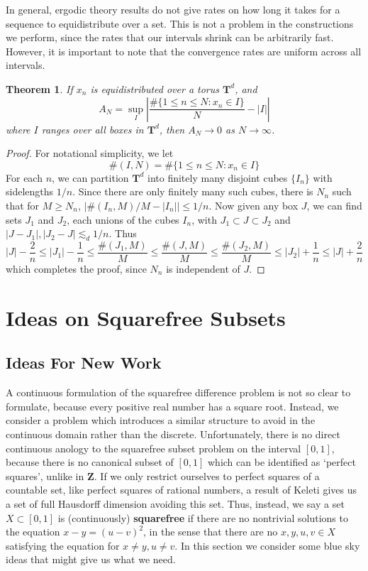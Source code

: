 \documentclass{report}
\theoremstyle{plain}
\theoremstyle{plain}
\newtheorem{theorem}{Theorem}
\begin{document}
In general, ergodic theory results do not give rates on how long it takes for a sequence to equidistribute over a set. This is not a problem in the constructions we perform, since the rates that our intervals shrink can be arbitrarily fast. However, it is important to note that the convergence rates are uniform across all intervals.

\begin{theorem}
    If $x_n$ is equidistributed over a torus $\mathbf{T}^d$, and
    \[ A_N = \sup_I \left| \frac{\# \{ 1 \leq n \leq N : x_n \in I \}}{N} - |I| \right| \]
    where $I$ ranges over all boxes in $\mathbf{T}^d$, then $A_N \to 0$ as $N \to \infty$.
\end{theorem}
\begin{proof}
    For notational simplicity, we let
    \[ \# (I,N) = \# \{ 1 \leq n \leq N: x_n \in I \} \]
    For each $n$, we can partition $\mathbf{T}^d$ into finitely many disjoint cubes $\{ I_n \}$ with sidelengths $1/n$. Since there are only finitely many such cubes, there is $N_n$ such that for $M \geq N_n$, $| \#(I_n,M)/M - |I_n|| \leq 1/n$. Now given any box $J$, we can find sets $J_1$ and $J_2$, each unions of the cubes $I_n$, with $J_1 \subset J \subset J_2$ and $|J - J_1|, |J_2 - J| \lesssim_d 1/n$. Thus
    \[ |J| - \frac{2}{n} \leq |J_1| - \frac{1}{n} \leq \frac{\#(J_1,M)}{M} \leq \frac{\#(J,M)}{M} \leq \frac{\#(J_2,M)}{M} \leq |J_2| + \frac{1}{n} \leq |J| + \frac{2}{n} \]
    which completes the proof, since $N_n$ is independent of $J$.
\end{proof}







\chapter{Ideas on Squarefree Subsets}

\section{Ideas For New Work}

A continuous formulation of the squarefree difference problem is not so clear to formulate, because every positive real number has a square root. Instead, we consider a problem which introduces a similar structure to avoid in the continuous domain rather than the discrete. Unfortunately, there is no direct continuous anology to the squarefree subset problem on the interval $[0,1]$, because there is no canonical subset of $[0,1]$ which can be identified as `perfect squares', unlike in $\mathbf{Z}$. If we only restrict ourselves to perfect squares of a countable set, like perfect squares of rational numbers, a result of Keleti gives us a set of full Hausdorff dimension avoiding this set. Thus, instead, we say a set $X \subset [0,1]$ is (continuously) {\bf squarefree} if there are no nontrivial solutions to the equation $x - y = (u - v)^2$, in the sense that there are no $x,y,u,v \in X$ satisfying the equation for $x \neq y, u \neq v$. In this section we consider some blue sky ideas that might give us what we need.
\end{document}

